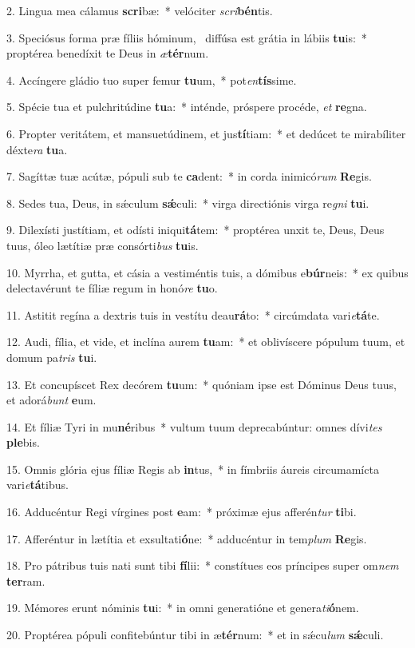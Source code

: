 2. Lingua mea cálamus \textbf{scri}bæ:~*  velóciter \textit{scri}\textbf{bén}tis.\

3. Speciósus forma præ fíliis hóminum, \dag\  diffúsa est grátia in lábiis \textbf{tu}is:~*  proptérea benedíxit te Deus in \textit{æ}\textbf{tér}num.\

4. Accíngere gládio tuo super femur \textbf{tu}um,~*  pot\textit{en}\textbf{tís}sime.\

5. Spécie tua et pulchritúdine \textbf{tu}a:~*  inténde, próspere procéde, \textit{et} \textbf{re}gna.\

6. Propter veritátem, et mansuetúdinem, et jus\textbf{tí}tiam:~*  et dedúcet te mirabíliter déxte\textit{ra} \textbf{tu}a.\

7. Sagíttæ tuæ acútæ, pópuli sub te \textbf{ca}dent:~*  in corda inimicó\textit{rum} \textbf{Re}gis.\

8. Sedes tua, Deus, in sǽculum \textbf{sǽ}culi:~*  virga directiónis virga re\textit{gni} \textbf{tu}i.\

9. Dilexísti justítiam, et odísti iniqui\textbf{tá}tem:~*  proptérea unxit te, Deus, Deus tuus, óleo lætítiæ præ consórti\textit{bus} \textbf{tu}is.\

10. Myrrha, et gutta, et cásia a vestiméntis tuis, a dómibus e\textbf{búr}neis:~*  ex quibus delectavérunt te fíliæ regum in honó\textit{re} \textbf{tu}o.\

11. Astitit regína a dextris tuis in vestítu deau\textbf{rá}to:~*  circúmdata vari\textit{e}\textbf{tá}te.\

12. Audi, fília, et vide, et inclína aurem \textbf{tu}am:~*  et oblivíscere pópulum tuum, et domum pa\textit{tris} \textbf{tu}i.\

13. Et concupíscet Rex decórem \textbf{tu}um:~*  quóniam ipse est Dóminus Deus tuus, et adorá\textit{bunt} \textbf{e}um.\

14. Et fíliæ Tyri in mu\textbf{né}ribus~*  vultum tuum deprecabúntur: omnes dívi\textit{tes} \textbf{ple}bis.\

15. Omnis glória ejus fíliæ Regis ab \textbf{in}tus,~*  in fímbriis áureis circumamícta vari\textit{e}\textbf{tá}tibus.\

16. Adducéntur Regi vírgines post \textbf{e}am:~*  próximæ ejus afferén\textit{tur} \textbf{ti}bi.\

17. Afferéntur in lætítia et exsultati\textbf{ó}ne:~*  adducéntur in tem\textit{plum} \textbf{Re}gis.\

18. Pro pátribus tuis nati sunt tibi \textbf{fí}lii:~*  constítues eos príncipes super om\textit{nem} \textbf{ter}ram.\

19. Mémores erunt nóminis \textbf{tu}i:~*  in omni generatióne et genera\textit{ti}\textbf{ó}nem.\

20. Proptérea pópuli confitebúntur tibi in æ\textbf{tér}num:~*  et in sǽcu\textit{lum} \textbf{sǽ}culi.\

